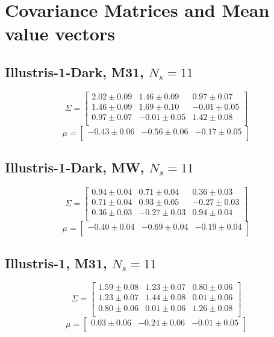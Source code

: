 \documentclass[a4paper,fleqn,usenatbib]{mnras}
\begin{document}
\section{Covariance Matrices and Mean value vectors}
\label{appendix:matrices}


\subsection{Illustris-1-Dark, M31, $N_s=11$}
\[
\Sigma=
\begin{bmatrix}
2.02 \pm 0.09 & 1.46 \pm 0.09 & 0.97 \pm 0.07\\
1.46 \pm 0.09 & 1.69 \pm 0.10 & -0.01 \pm 0.05\\
0.97 \pm 0.07 & -0.01 \pm 0.05 & 1.42 \pm 0.08\\
\end{bmatrix}
\]
\[
\mu=
\begin{bmatrix}
-0.43 \pm 0.06 & -0.56 \pm 0.06 & -0.17 \pm 0.05\\
\end{bmatrix}
\]
\subsection{Illustris-1-Dark, MW, $N_s=11$}
\[
\Sigma=
\begin{bmatrix}
0.94 \pm 0.04 & 0.71 \pm 0.04 & 0.36 \pm 0.03\\
0.71 \pm 0.04 & 0.93 \pm 0.05 & -0.27 \pm 0.03\\
0.36 \pm 0.03 & -0.27 \pm 0.03 & 0.94 \pm 0.04\\
\end{bmatrix}
\]
\[
\mu=
\begin{bmatrix}
-0.40 \pm 0.04 & -0.69 \pm 0.04 & -0.19 \pm 0.04\\
\end{bmatrix}
\]

\subsection{Illustris-1, M31, $N_s=11$}
\[
\Sigma=
\begin{bmatrix}
1.59 \pm 0.08 & 1.23 \pm 0.07 & 0.80 \pm 0.06\\
1.23 \pm 0.07 & 1.44 \pm 0.08 & 0.01 \pm 0.06\\
0.80 \pm 0.06 & 0.01 \pm 0.06 & 1.26 \pm 0.08\\
\end{bmatrix}
\]
\[
\mu=
\begin{bmatrix}
0.03 \pm 0.06 & -0.24 \pm 0.06 & -0.01 \pm 0.05\\
\end{bmatrix}
\]
\end{document}
